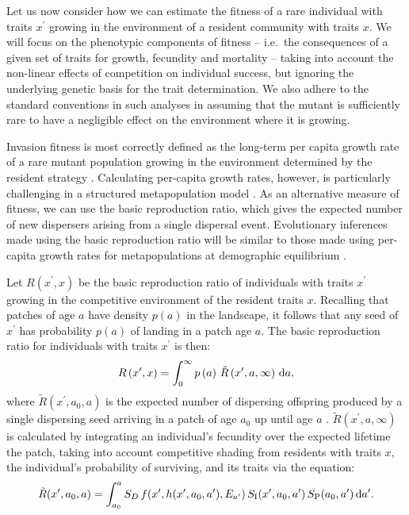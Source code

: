 \documentclass[10pt,twoside]{article}
\begin{document}
Let us now consider how we can estimate the fitness of a rare individual
with traits \(x^\prime\) growing in the environment of a resident
community with traits \(x\). We will focus on the phenotypic components
of fitness -- i.e.~the consequences of a given set of traits for growth,
fecundity and mortality -- taking into account the non-linear effects of
competition on individual success, but ignoring the underlying genetic
basis for the trait determination. We also adhere to the standard
conventions in such analyses in assuming that the mutant is sufficiently
rare to have a negligible effect on the environment where it is growing.

Invasion fitness is most correctly defined as the long-term per capita
growth rate of a rare mutant population growing in the environment
determined by the resident strategy \citep{Metz-1992}. Calculating
per-capita growth rates, however, is particularly challenging in a
structured metapopulation model \citep{Gyllenberg-2001, Metz-2001}. As
an alternative measure of fitness, we can use the basic reproduction
ratio, which gives the expected number of new dispersers arising from a
single dispersal event. Evolutionary inferences made using the basic
reproduction ratio will be similar to those made using per-capita growth
rates for metapopulations at demographic equilibrium
\citep{Gyllenberg-2001, Metz-2001}.

Let \(R\left(x^\prime,x\right)\) be the basic reproduction ratio of
individuals with traits \(x^\prime\) growing in the competitive
environment of the resident traits \(x\). Recalling that patches of age
\(a\) have density \(p(a)\) in the landscape, it follows that any seed
of \(x^\prime\) has probability \(p(a)\) of landing in a patch age
\(a\). The basic reproduction ratio for individuals with traits
\(x^\prime\) is then:
\begin{equation} \label{eq:InvFit}
  R\left(x^\prime,x\right)=\int _0^{\infty }p\left(a\right) \, \tilde{R}\left(x^\prime,a, \infty \right)\, {\rm d}a ,
\end{equation}
where \(\tilde{R}\left(x^\prime,a_0,a \right)\) is the expected number
of dispersing offspring produced by a single dispersing seed arriving in
a patch of age \(a_0\) up until age \(a\)
\citep{Gyllenberg-2001, Metz-2001}.
\(\tilde{R}\left(x^\prime,a,\infty\right)\) is calculated by integrating
an individual's fecundity over the expected lifetime the patch, taking
into account competitive shading from residents with traits \(x\), the
individual's probability of surviving, and its traits via the equation:
\begin{equation} \label{eq:tildeR}
  \tilde{R}(x^\prime, a_0, a) =\int_{a_0}^{a}  S_D \, f(x^\prime, h(x^\prime, a_0, a^\prime), E_{a^\prime}) \, S_{\rm I} (x^\prime, a_0, a^\prime) \, S_{\rm P} (a_0,a^\prime) \,  {\rm d} a^\prime.
\end{equation}
\end{document}
